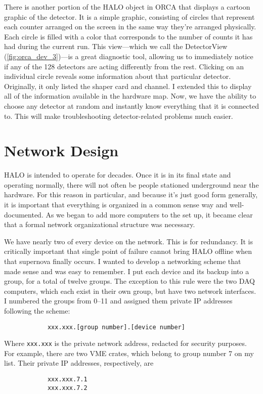 		There is another portion of the HALO object in ORCA that displays a cartoon graphic of the detector. It is a simple graphic, consisting of circles that represent each \he counter arranged on the screen in the same way they're arranged physically. Each circle is filled with a color that corresponds to the number of counts it has had during the current run. This view---which we call the DetectorView (\FIG \ref{fig:orca_dev_3})---is a great diagnostic tool, allowing us to immediately notice if any of the 128 detectors are acting differently from the rest. Clicking on an individual circle reveals some information about that particular detector. Originally, it only listed the shaper card and channel. I extended this to display all of the information available in the hardware map. Now, we have the ability to choose any \he detector at random and instantly know everything that it is connected to. This will make troubleshooting detector-related problems much easier.

	
	\section{Network Design}
		HALO is intended to operate for decades. Once it is in its final state and operating normally, there will not often be people stationed underground near the hardware. For this reason in particular, and because it's just good form generally, it is important that everything is organized in a common sense way and well-documented. As we began to add more computers to the set up, it became clear that a formal network organizational structure was necessary. 

		We have nearly two of every device on the network. This is for redundancy. It is critically important that single point of failure cannot bring HALO offline when that supernova finally occurs. I wanted to develop a networking scheme that made sense and was easy to remember. I put each device and its backup into a group, for a total of twelve groups. The exception to this rule were the two DAQ computers, which each exist in their own group, but have two network interfaces. I numbered the groups from 0--11 and assigned them private IP addresses following the scheme:
		\begin{verbatim}
		    xxx.xxx.[group number].[device number]
		\end{verbatim}
		Where \verb$xxx.xxx$ is the private network address, redacted for security purposes. For example, there are two VME crates, which belong to group number 7 on my list. Their private IP addresses, respectively, are
		\begin{verbatim}
		    xxx.xxx.7.1
		    xxx.xxx.7.2
		\end{verbatim}

